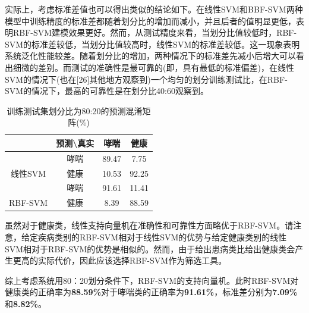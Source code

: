 实际上，考虑标准差值也可以得出类似的结论如下。在线性SVM和BBF-SVM两种模型中训练精度的标准差都随着划分比的增加而减小，并且后者的值明显更低，表明RBF-SVM建模效果更好。然而，从测试精度来看，当划分比值较低时，RBF-SVM的标准差较低，当划分比值较高时，线性SVM的标准差较低。这一现象表明系统泛化性能较差。随着划分比的增加，两种情况下的标准差先减小后增大可以看出细微的差别。而测试的准确性是最可靠的(即，具有最低的标准偏差)，在线性SVM的情况下(也在[26]其他地方观察到)一个均匀的划分训练测试比，在RBF-SVM的情况下，最高的可靠性是在划分比40:60观察到。
\begin{table}[h]
\centering

\begin{tabular}{cccc}
\hline
\multicolumn{1}{l}{{\color[HTML]{000000} }}      & {\color[HTML]{000000} \textbf{预测\textbackslash{}真实}} & {\color[HTML]{000000} \textbf{哮喘}} & {\color[HTML]{000000} \textbf{健康}} \\ \hline
{\color[HTML]{000000} }                          & {\color[HTML]{000000} 哮喘}                            & {\color[HTML]{000000} 89.47}       & {\color[HTML]{000000} 7.75}        \\
\multirow{-2}{*}{{\color[HTML]{000000} 线性SVM}}   & {\color[HTML]{000000} 健康}                            & {\color[HTML]{000000} 10.53}       & {\color[HTML]{000000} 92.25}       \\
{\color[HTML]{000000} }                          & {\color[HTML]{000000} 哮喘}                            & {\color[HTML]{000000} 91.61}       & {\color[HTML]{000000} 11.41}       \\
\multirow{-2}{*}{{\color[HTML]{000000} RBF-SVM}} & {\color[HTML]{000000} 健康}                            & {\color[HTML]{000000} 8.39}        & {\color[HTML]{000000} 88.59}       \\ \hline
\end{tabular}
\caption{训练测试集划分比为80:20的预测混淆矩阵(\%)}
\end{table}

虽然对于健康类，线性支持向量机在准确性和可靠性方面略优于RBF-SVM。请注意，给定疾病类别的RBF-SVM相对于线性SVM的优势与给定健康类别的线性SVM相对于RBF-SVM的优势是相似的。然而，由于给出患病类比给出健康类会产生更高的实际代价，因此应该选择RBF-SVM作为筛选工具。

综上考虑系统用80：20划分条件下，RBF-SVM的支持向量机。此时RBF-SVM对健康类的正确率为\textbf{88.59\%}对于哮喘类的正确率为\textbf{91.61\%}，标准差分别为\textbf{7.09\%}和\textbf{8.82\%}。